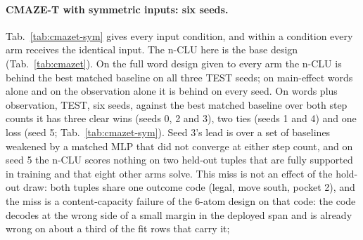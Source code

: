 \documentclass{article} %
\begin{document}
\paragraph{CMAZE-T with symmetric inputs: six seeds.}
Tab.~\ref{tab:cmazet-sym} gives every input condition, and within a condition every arm receives the
identical input. The n-CLU here is the base design (Tab.~\ref{tab:cmazet}). On the full word design given %
to every arm the n-CLU is behind the best matched baseline on all three TEST seeds; on main-effect words alone and on the observation alone it is behind on every seed. On words
plus observation, TEST, six seeds, against the
best matched baseline over both step counts it has three
clear wins (seeds 0, 2 and 3), two ties (seeds 1 and 4) and
one loss (seed 5; Tab.~\ref{tab:cmazet-sym}). Seed 3's lead is over a set of baselines weakened
by a matched MLP that did not converge at either step count, and on seed 5 the n-CLU scores nothing on two
held-out tuples that are fully supported in training and that eight other arms solve. This miss is
not an effect of the hold-out draw: both tuples share one outcome code (legal, move south, pocket 2),
and the miss is a content-capacity failure of the 6-atom design on that code: the code decodes at the wrong
side of a small margin in the deployed span and is already wrong on about a third of the fit rows that carry it; %
\end{document}
